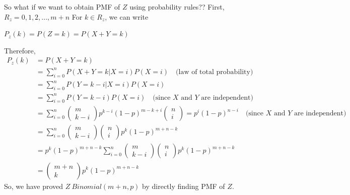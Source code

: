 \documentclass{report}
\begin{document}
\noindent So what if we want to obtain PMF of $Z$ using probability rules??\newline
\noindent First, $R_z = {0,1,2,...,m+n}$\newline
\noindent For $k \in R_z$, we can write\newline
\centerline{$P_z(k)=P(Z=k)=P(X+Y=k)$}\newline
Therefore, \newline
$\begin{aligned}
	P_z(k) &= P(X+Y=k) \\
    	&= \sum^n_{i=0} P(X+Y=k | X = i)P(X = i) \quad \text{(law of total probability)} \\
        &= \sum^n_{i=0} P(Y=k-i | X = i)P(X = i) \\
        &= \sum^n_{i=0} P(Y=k-i)P(X = i) \quad \text{(since } X \text{ and } Y \text{ are independent)} \\
        &= \sum^n_{i=0} \begin{pmatrix}
							m \\ 
							k-i
						\end{pmatrix} p^{k-i}(1-p)^{m-k+i} \begin{pmatrix}
                                                              n \\ 
                                                              i
                                                          \end{pmatrix} = p^{i}(1-p)^{n-i} \quad \text{(since $X$ and $Y$ are independent)} \\
        &= \sum^n_{i=0} \begin{pmatrix}
							m \\ 
							k-i
						\end{pmatrix} \begin{pmatrix}
                                          n \\ 
                                          i
                                      \end{pmatrix} p^{k}(1-p)^{m+n-k} \\
        &= p^{k}(1-p)^{m+n-k} \sum^n_{i=0} \begin{pmatrix}
                                                m \\ 
                                                k-i
                                            \end{pmatrix} \begin{pmatrix}
                                                              n \\ 
                                                              i
                                                          \end{pmatrix} p^{k}(1-p)^{m+n-k} \\
        &= \begin{pmatrix}
            m+n \\ 
            k
            \end{pmatrix} p^{k}(1-p)^{m+n-k}
\end{aligned}$\newline\newline
So, we have proved $Z~Binomial(m+n,p)$ by directly finding PMF of $Z$.
\end{document}
